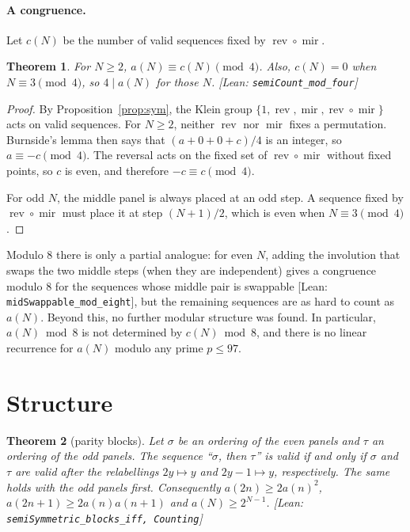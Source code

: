 \documentclass[11pt]{article}
\newtheorem{theorem}{Theorem}
\theoremstyle{definition}
\theoremstyle{remark}
\newcommand{\lean}[1]{\textsf{\small[Lean: \texttt{#1}]}}
\DeclareMathOperator{\rev}{rev}
\DeclareMathOperator{\mir}{mir}
\begin{document}
\paragraph{A congruence.}
Let $c(N)$ be the number of valid sequences fixed by $\rev\circ\mir$.

\begin{theorem}\label{thm:mod4}
For $N\ge2$, $a(N)\equiv c(N)\pmod 4$. Also, $c(N)=0$ when $N\equiv 3\pmod 4$, so
$4\mid a(N)$ for those $N$. \lean{semiCount\_mod\_four}
\end{theorem}

\begin{proof}
By Proposition~\ref{prop:sym}, the Klein group $\{1,\rev,\mir,\rev\circ\mir\}$ acts
on valid sequences. For $N\ge2$, neither $\rev$ nor $\mir$ fixes a permutation. Burnside's
lemma then says that $(a+0+0+c)/4$ is an integer, so $a\equiv -c\pmod 4$. The
reversal acts on the fixed set of $\rev\circ\mir$ without fixed points, so $c$ is even,
and therefore $-c\equiv c\pmod 4$.

For odd $N$, the middle panel is always placed at an odd step. A sequence fixed by
$\rev\circ\mir$ must place it at step $(N+1)/2$, which is even when
$N\equiv3\pmod4$.
\end{proof}

Modulo $8$ there is only a partial analogue: for even $N$, adding the involution that swaps the two middle steps (when they are independent) gives a congruence modulo $8$ for the sequences whose middle pair is swappable \lean{midSwappable\_mod\_eight}, but the remaining sequences are as hard to count as $a(N)$. Beyond this, no further modular structure was found. In particular, $a(N)\bmod 8$ is not determined
by $c(N)\bmod 8$, and there is no linear recurrence for $a(N)$ modulo any prime $p\le 97$.

\section{Structure}

\begin{theorem}[parity blocks]
Let $\sigma$ be an ordering of the even panels and $\tau$ an ordering of the odd panels.
The sequence ``$\sigma$, then $\tau$'' is valid if and only if $\sigma$ and $\tau$ are
valid after the relabellings $2y\mapsto y$ and $2y-1\mapsto y$, respectively. The same
holds with the odd panels first. Consequently
$a(2n)\ge 2a(n)^2$, $a(2n+1)\ge 2a(n)a(n+1)$ and $a(N)\ge 2^{N-1}$.
\lean{semiSymmetric\_blocks\_iff, Counting}
\end{theorem}
\end{document}
